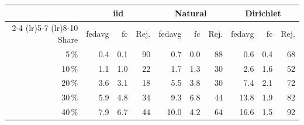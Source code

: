 \begin{tabular}{rrrrrrrrrr}
\toprule
 & \multicolumn{3}{c}{\gls{iid}} & \multicolumn{3}{c}{Natural} & \multicolumn{3}{c}{Dirichlet} \\
\cmidrule(lr){2-4} \cmidrule(lr){5-7} \cmidrule(lr){8-10}
Share & \gls{fedavg} & \gls{fc} & Rej. & \gls{fedavg} & \gls{fc} & Rej. & \gls{fedavg} & \gls{fc} & Rej. \\
\midrule
5\,\% & 0.4 & 0.1 & 90 & 0.7 & 0.0 & 88 & 0.6 & 0.4 & 68 \\
10\,\% & 1.1 & 1.0 & 22 & 1.7 & 1.3 & 30 & 2.6 & 1.6 & 52 \\
20\,\% & 3.6 & 3.1 & 18 & 5.5 & 3.8 & 30 & 7.4 & 2.1 & 72 \\
30\,\% & 5.9 & 4.8 & 34 & 9.3 & 6.8 & 44 & 13.8 & 1.9 & 82 \\
40\,\% & 7.9 & 6.7 & 44 & 10.0 & 4.2 & 64 & 16.6 & 1.5 & 92 \\
\bottomrule
\end{tabular}
